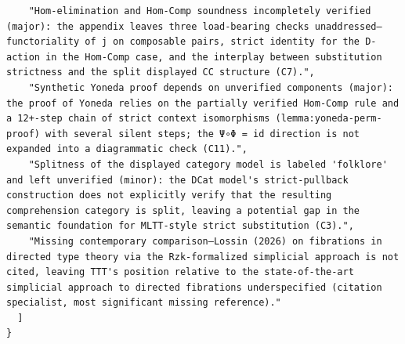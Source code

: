 \documentclass[11pt]{article}
\begin{document}
\begin{verbatim}
    "Hom-elimination and Hom-Comp soundness incompletely verified (major): the appendix leaves three load-bearing checks unaddressed—functoriality of j on composable pairs, strict identity for the D-action in the Hom-Comp case, and the interplay between substitution strictness and the split displayed CC structure (C7).",
    "Synthetic Yoneda proof depends on unverified components (major): the proof of Yoneda relies on the partially verified Hom-Comp rule and a 12+-step chain of strict context isomorphisms (lemma:yoneda-perm-proof) with several silent steps; the Ψ∘Φ = id direction is not expanded into a diagrammatic check (C11).",
    "Splitness of the displayed category model is labeled 'folklore' and left unverified (minor): the DCat model's strict-pullback construction does not explicitly verify that the resulting comprehension category is split, leaving a potential gap in the semantic foundation for MLTT-style strict substitution (C3).",
    "Missing contemporary comparison—Lossin (2026) on fibrations in directed type theory via the Rzk-formalized simplicial approach is not cited, leaving TTT's position relative to the state-of-the-art simplicial approach to directed fibrations underspecified (citation specialist, most significant missing reference)."
  ]
}
\end{verbatim}
\end{document}
